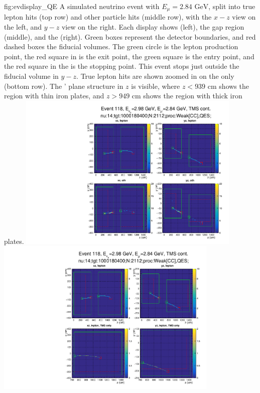 \begin{dunefigure}{fig:evdisplay_QE}
{A simulated neutrino   event with $E_\mu=2.84\text{ GeV}$, split into true lepton hits (top row) and other particle hits (middle row), with the $x-z$ view on the left, and $y-z$ view on the right. Each display shows  (left), the gap region (middle), and the  (right). Green boxes represent the detector boundaries, and red dashed boxes the fiducial volumes. The green circle is the lepton production point, the red square in  is the exit point, the green square is the  entry point, and the red square in the  is the stopping point. This event stops just outside the fiducial volume in $y-z$. True lepton hits are shown zoomed in on the  only (bottom row). The ' plane structure in $z$ is visible, where $z<939\text{ cm}$ shows the region with thin iron plates, and $z>949\text{ cm}$ shows the region with thick iron plates.}
\includegraphics[trim=0 0 0 55, clip, width=0.8\textwidth]{graphics/tms/Simulation/EventDisplay/pg_0009.pdf}
\\[\smallskipamount]
\includegraphics[trim=0 0 0 305, clip, width=0.8\textwidth]{graphics/tms/Simulation/EventDisplay/pg_0010.pdf}
\end{dunefigure}

